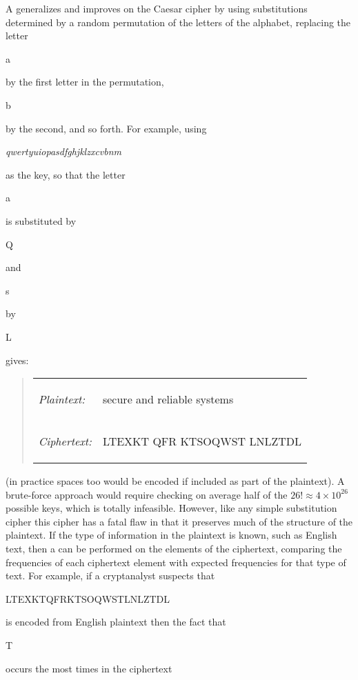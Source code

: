 A  generalizes and improves on the Caesar cipher by
using substitutions determined by a random permutation of the letters of the alphabet,
replacing the letter \begin{code}a\end{code} by the first letter in the permutation,
\begin{code}b\end{code} by the second, and so forth.
For example, using \begin{code}\emph{qwertyuiopasdfghjklzxcvbnm}\end{code} as the key,
so that the letter \begin{code}a\end{code} is substituted by \begin{code}Q\end{code}
and \begin{code}s\end{code} by \begin{code}L\end{code} gives:
\begin{quote}\begin{tabular}{ll}
  \emph{Plaintext:} & \begin{code}secure and reliable systems\end{code} \\
  \emph{Ciphertext:}& \begin{code}LTEXKT QFR KTSOQWST LNLZTDL\end{code}
\end{tabular}\end{quote}
(in practice spaces too would be encoded if included as part of
the plaintext). A brute-force approach would require checking on
average half of the $26!\approx4\times10^{26}$ possible keys,
which is totally infeasible. However, like any simple substitution
cipher this cipher has a fatal flaw in that it preserves much of
the structure of the plaintext. If the type of information in the
plaintext is known, such as English text, then a  can be performed on the elements of the ciphertext,
comparing the frequencies of each ciphertext element with expected
frequencies for that type of text. For example, if a cryptanalyst
suspects that \begin{code}LTEXKTQFRKTSOQWSTLNLZTDL\end{code} is
encoded from English plaintext then the fact that
\begin{code}T\end{code} occurs the most times in the ciphertext
